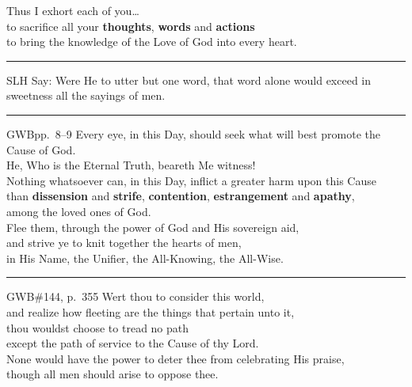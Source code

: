 \documentclass[14pt]{extarticle}
\begin{document}
\begin{hafez}{}{}
  Thus I exhort each of you\dots{} \\
  to sacrifice all your \textbf{thoughts}, \textbf{words} and \textbf{actions} \\
  to bring the knowledge of the Love of God into every heart.
\end{hafez}

\noindent\rule{2cm}{0.4pt}

\begin{hafez}{SLH}{}
  Say: Were He to utter but one word, that word alone would exceed in
  sweetness all the sayings of men.
\end{hafez}

\noindent\rule{2cm}{0.4pt}

\begin{hafez}{GWB}{pp.~8--9}
  Every eye, in this Day, should seek what will best promote the Cause of God. \\
  He, Who is the Eternal Truth, beareth Me witness! \\
  Nothing whatsoever can, in this Day, inflict a greater harm upon this Cause \\
    \mbox{\hspace{0.1in}}than \textbf{dissension} and \textbf{strife},
      \textbf{contention}, \textbf{estrangement} and \textbf{apathy}, \\
    \mbox{\hspace{0.1in}}among the loved ones of God. \\
  Flee them, through the power of God and His sovereign aid, \\
    \mbox{\hspace{0.1in}}and strive ye to knit together the hearts of men, \\
    \mbox{\hspace{0.1in}}in His Name, the Unifier, the All-Knowing, the All-Wise.
\end{hafez}

\noindent\rule{2cm}{0.4pt}

\begin{hafez}{GWB}{\#144, p.~355}
  Wert thou to consider this world, \\
    \mbox{\hspace{0.1in}}and realize how fleeting are the things that pertain unto it, \\
  thou wouldst choose to tread no path \\
    \mbox{\hspace{0.1in}}except the path of service to the Cause of thy Lord. \\
  None would have the power to deter thee from celebrating His praise, \\
  though all men should arise to oppose thee.
\end{hafez}
\end{document}
